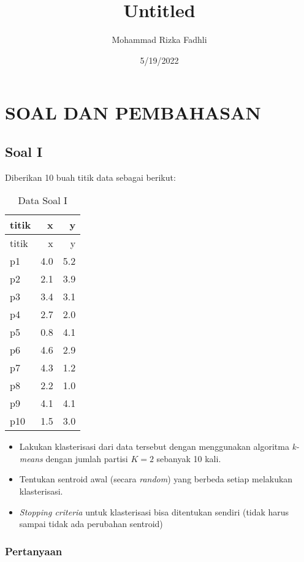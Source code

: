 \documentclass[
]{article}
\title{Untitled}
\author{Mohammad Rizka Fadhli}
\date{5/19/2022}
\providecommand{\tightlist}{%
  \setlength{\itemsep}{0pt}\setlength{\parskip}{0pt}}
\begin{document}
\maketitle

\newpage

\hypertarget{soal-dan-pembahasan}{%
\section{SOAL DAN PEMBAHASAN}\label{soal-dan-pembahasan}}

\hypertarget{soal-i}{%
\subsection{Soal I}\label{soal-i}}

Diberikan 10 buah titik data sebagai berikut:

\begin{longtable}[]{@{}lrr@{}}
\caption{Data Soal I}\tabularnewline
\toprule
titik & x & y \\
\midrule
\endfirsthead
\toprule
titik & x & y \\
\midrule
\endhead
p1 & 4.0 & 5.2 \\
p2 & 2.1 & 3.9 \\
p3 & 3.4 & 3.1 \\
p4 & 2.7 & 2.0 \\
p5 & 0.8 & 4.1 \\
p6 & 4.6 & 2.9 \\
p7 & 4.3 & 1.2 \\
p8 & 2.2 & 1.0 \\
p9 & 4.1 & 4.1 \\
p10 & 1.5 & 3.0 \\
\bottomrule
\end{longtable}

\begin{itemize}
\tightlist
\item
  Lakukan klasterisasi dari data tersebut dengan menggunakan algoritma
  \emph{k-means} dengan jumlah partisi \(K=2\) sebanyak 10 kali.
\item
  Tentukan sentroid awal (secara \emph{random}) yang berbeda setiap
  melakukan klasterisasi.
\item
  \emph{Stopping criteria} untuk klasterisasi bisa ditentukan sendiri
  (tidak harus sampai tidak ada perubahan sentroid)
\end{itemize}

\hypertarget{pertanyaan}{%
\subsubsection{Pertanyaan}\label{pertanyaan}}
\end{document}

